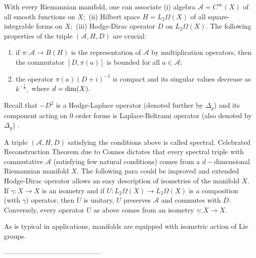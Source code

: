\documentclass{article}
\begin{document}
With every Riemannian manifold, one can associate (i) algebra $\mathcal{A}=C^{\infty}(X)$ of all smooth functions on $X;$ (ii) Hilbert space $H=L_2\Omega(X)$ of all square-integrable forms on $X;$ (iii) Hodge-Dirac operator $D$ on $L_2\Omega(X).$ The following properties of the triple $(\mathcal{A},H,D)$ are crucial:
\begin{enumerate}
\item if $\pi:\mathcal{A}\to B(H)$ is the representation of $\mathcal{A}$ by multiplication operators, then the commutator $[D,\pi(a)]$ is bounded for all $a\in\mathcal{A};$
\item the operator $\pi(a)(D+i)^{-1}$ is compact and its singular values decrease as $k^{-\frac1d},$ where $d={\rm dim}(X).$
\end{enumerate}
Recall that $-D^2$ is a Hodge-Laplace operator (denoted further by $\Delta_g$) and its component acting on $0$ order forms is Laplace-Beltrami operator (also denoted by $\Delta_g$) \cite{Rosenberg}.

A triple $(\mathcal{A},H,D)$ satisfying the conditions above is called spectral. Celebrated Reconstruction Theorem due to Connes dictates that every spectral triple with commutative $\mathcal{A}$ (satisfying few natural conditions) comes from a $d-$dimensional Riemannian manifold $X.$
{\color{blue} The following para could be improved and extended}
Hodge-Dirac operator allows an easy description of isometries of the manifold $X.$ If $\gamma:X\to X$ is an isometry and if $U:L_2\Omega(X)\to L_2\Omega(X)$ is a composition (with $\gamma$) operator, then $U$ is unitary, $U$ preserves $\mathcal{A}$ and commutes with $D.$ Conversely, every operator $U$ as above comes from an isometry $\gamma:X\to X.$


As is typical in applications, manifolds are equipped with isometric action of Lie groups. 


------------------------------------------
\end{document}
